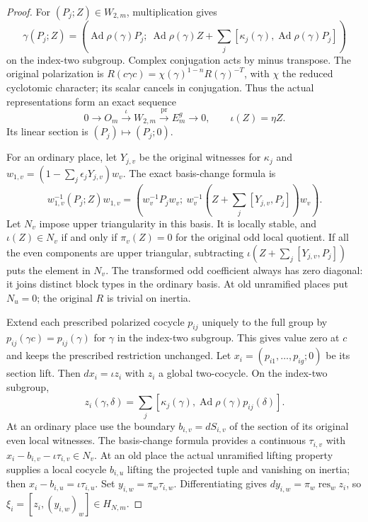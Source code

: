 \begin{proof}
For $(P_j;Z)\in W_{2,m}$, multiplication gives
\[
 \gamma(P_j;Z)=
 \left(\operatorname{Ad}\rho(\gamma)P_j;\
       \operatorname{Ad}\rho(\gamma)Z+
       \sum_j[\kappa_j(\gamma),\operatorname{Ad}\rho(\gamma)P_j]\right)
\]
on the index-two subgroup. Complex conjugation acts by minus
transpose. The original polarization is
$R(c\gamma c)=\chi(\gamma)^{1-n}R(\gamma)^{-T}$, with $\chi$
the reduced cyclotomic character; its scalar cancels in conjugation.
Thus the actual representations form an exact sequence
\[
                 0\to O_m\xrightarrow{\iota}W_{2,m}
                        \xrightarrow{\mathrm{pr}}E_m^g\to0,
 \qquad \iota(Z)=\eta Z.
\]
Its linear section is $(P_j)\mapsto(P_j;0)$.

For an ordinary place, let $Y_{j,v}$ be the original witnesses
for $\kappa_j$ and $w_{1,v}=(1-\sum_j\epsilon_jY_{j,v})w_v$.
The exact basis-change formula is
\[
 w_{1,v}^{-1}(P_j;Z)w_{1,v}
  =\left(w_v^{-1}P_jw_v;\
     w_v^{-1}\left(Z+\sum_j[Y_{j,v},P_j]\right)w_v\right).
\]
Let $N_v$ impose upper triangularity in this basis. It is locally
stable, and $\iota(Z)\in N_v$ if and only if $\pi_v(Z)=0$ for
the original odd local quotient. If all the even components
are upper triangular, subtracting
$\iota(Z+\sum_j[Y_{j,v},P_j])$ puts the element in $N_v$.
The transformed odd coefficient always has zero diagonal:
it joins distinct block types in the ordinary basis.
At old unramified places put $N_u=0$; the original $R$ is
trivial on inertia.

Extend each prescribed polarized cocycle $p_{ij}$ uniquely to the
full group by $p_{ij}(\gamma c)=p_{ij}(\gamma)$ for $\gamma$
in the index-two subgroup. This gives value zero at $c$ and
keeps the prescribed restriction unchanged.
Let $x_i=(p_{i1},\ldots,p_{ig};0)$ be its section lift.
Then $dx_i=\iota z_i$ with $z_i$ a global
two-cocycle. On the index-two subgroup,
\[
 z_i(\gamma,\delta)=
       \sum_j[\kappa_j(\gamma),
                    \operatorname{Ad}\rho(\gamma)p_{ij}(\delta)].
\]
At an ordinary place use the boundary $b_{i,v}=dS_{i,v}$ of
the section of its original even local witnesses. The basis-change
formula provides a continuous $\tau_{i,v}$ with
$x_i-b_{i,v}-\iota\tau_{i,v}\in N_v$.
At an old place the actual unramified lifting property supplies
a local cocycle $b_{i,u}$ lifting the projected tuple and vanishing
on inertia; then $x_i-b_{i,u}=\iota\tau_{i,u}$.
Set $y_{i,w}=\pi_w\tau_{i,w}$. Differentiating gives
$dy_{i,w}=\pi_w\operatorname{res}_wz_i$, so
$\xi_i=[z_i,(y_{i,w})_w]\in H_{N,m}$.


\end{proof}
